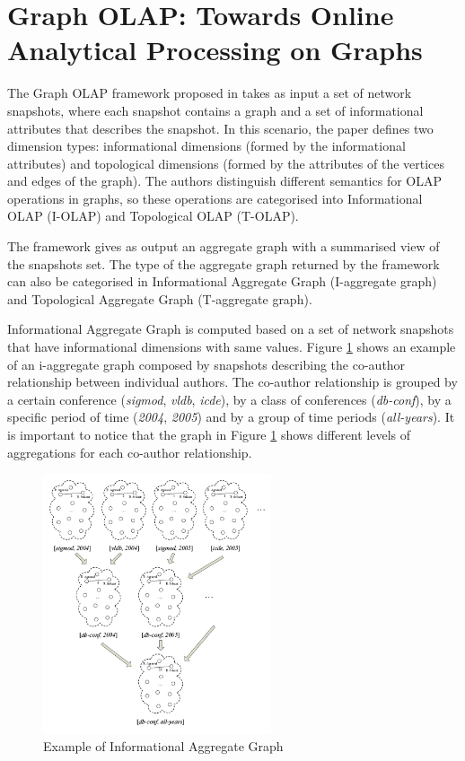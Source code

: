 \section{Graph OLAP: Towards Online Analytical Processing on Graphs}

The Graph OLAP framework  proposed in \cite{Chen2008} takes as input a set of network snapshots, where each snapshot contains a graph and a set of informational attributes that describes the snapshot. In this scenario, the paper defines two dimension types: informational dimensions (formed by the informational attributes) and topological dimensions (formed by the attributes of the vertices and edges of the graph). The authors distinguish different semantics for OLAP operations in graphs, so these operations are categorised into Informational OLAP (I-OLAP) and Topological OLAP (T-OLAP).

The framework gives as output an aggregate graph with a summarised view of the snapshots set. The type of the aggregate graph returned by the framework can also be categorised in Informational Aggregate Graph (I-aggregate graph) and Topological Aggregate Graph (T-aggregate graph). 
 
Informational Aggregate Graph is computed based on a set of network snapshots that have informational dimensions with same values. Figure \ref{fig:figure15} shows an example of an i-aggregate graph composed by snapshots describing the co-author relationship between individual authors. The co-author relationship is grouped by a certain conference (\emph{sigmod}, \emph{vldb}, \emph{icde}), by a class of conferences (\emph{db-conf}), by a specific period of time (\emph{2004}, \emph{2005}) and by a group of time periods (\emph{all-years}). It is important to notice that the graph in Figure \ref{fig:figure15} shows different levels of aggregations for each co-author relationship. 

\begin{figure}[ht]
\centering
\includegraphics[width=0.6\textwidth]{../i_aggregated_graph_example.png}
\caption{Example of Informational Aggregate Graph \cite{Chen2008}}
\label{fig:figure15}
\end{figure}


